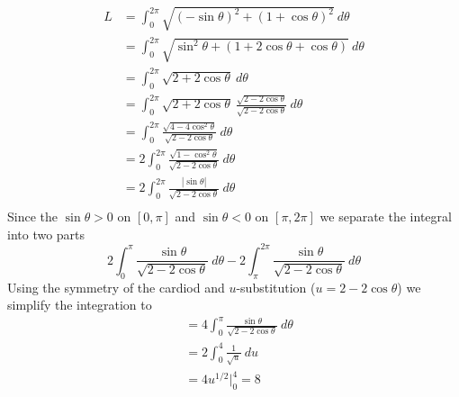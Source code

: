 \documentclass[11pt]{report}
\begin{document}
\begin{align}
L & = \int_0^{2\pi} \sqrt{(-\sin \theta)^2  + (1 + \cos \theta)^2}~d\theta \\
& = \int_0^{2\pi} \sqrt{\sin^2 \theta + (1 + 2\cos \theta + \cos \theta)}~d\theta\\
& = \int_0^{2\pi} \sqrt{2 + 2\cos \theta}~d\theta\\
& = \int_0^{2\pi} \sqrt{2 + 2\cos \theta}~\frac{\sqrt {2-2\cos \theta}}{\sqrt {2-2\cos \theta}}~d\theta\\
& = \int_0^{2\pi} \frac{\sqrt{4 - 4\cos^2 \theta}}{\sqrt {2-2\cos \theta}}~d\theta\\
& = 2\int_0^{2\pi} \frac{\sqrt{1 - \cos^2 \theta}}{\sqrt {2-2\cos \theta}}~d\theta\\
& = 2\int_0^{2\pi} \frac{|\sin \theta|}{\sqrt {2-2\cos \theta}}~d\theta\\
\end{align}
Since the $\sin \theta > 0$ on $[0, \pi]$ and $\sin \theta < 0$ on $[\pi, 2\pi]$ we separate the integral into two parts\\
$$2\int_0^{\pi} \frac{\sin \theta}{\sqrt {2-2\cos \theta}}~d\theta - 2\int_{\pi}^{2\pi} \frac{\sin \theta}{\sqrt {2-2\cos \theta}}~d\theta$$
Using the symmetry of the cardiod and $u$-substitution ($u = 2 - 2\cos \theta$) we simplify the integration to\\
\begin{align}
& = 4\int_0^{\pi} \frac{\sin \theta}{\sqrt {2-2\cos \theta}}~d\theta\\
& = 2\int_0^4 \frac{1}{\sqrt u}~du\\
& = 4  u^{1/2}\biggr|_0^4 = 8\\
\end{align}
\end{document}
